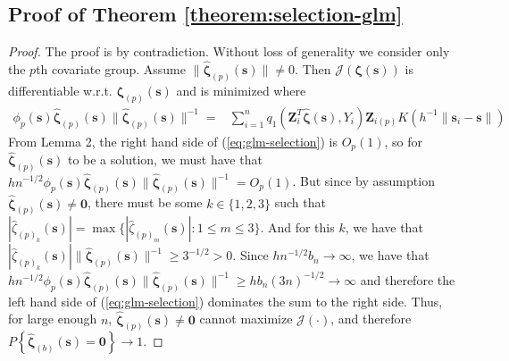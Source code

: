 \documentclass[authoryear,review, 12pt]{elsarticle}
\begin{document}
\subsection*{Proof of Theorem \ref{theorem:selection-glm}}
\begin{proof}
The proof is by contradiction. Without loss of generality we consider
only the $p$th covariate group.
Assume $\|\hat{\bm{\zeta}}_{(p)}(\bm{s})\|\ne0$. Then $\mathcal{J}\left(\bm{\zeta}(\bm{s})\right)$
is differentiable w.r.t. $\bm{\zeta}_{(p)}(\bm{s})$ and is minimized
where 
\begin{align}
\phi_{p}(\bm{s})\hat{\bm{\zeta}}_{(p)}(\bm{s})\|\hat{\bm{\zeta}}_{(p)}(\bm{s})\|^{-1}= & \sum_{i=1}^{n}q_{1}\!\left(\bm{Z}_{i}^{T}\hat{\bm{\zeta}}(\bm{s}),Y_{i}\right)\bm{Z}_{i(p)}K\left(h^{-1}\|\bm{s}_{i}-\bm{s}\|\right)\label{eq:glm-selection}
\end{align}
From Lemma 2, the right hand side of (\ref{eq:glm-selection})
is $O_{p}\left(1\right)$, so for $\hat{\bm{\zeta}}_{(p)}(\bm{s})$
to be a solution, we must have that $hn^{-1/2}\phi_{p}(\bm{s})\hat{\bm{\zeta}}_{(p)}(\bm{s})\|\hat{\bm{\zeta}}_{(p)}(\bm{s})\|^{-1}=O_{p}\left(1\right)$.
But since by assumption $\hat{\bm{\zeta}}_{(p)}(\bm{s})\ne\bm{0}$,
there must be some $k\in\{1,2,3\}$ such that $|\hat{\zeta}_{(p)_{k}}(\bm{s})|=\max\{|\hat{\zeta}_{(p)_{m}}(\bm{s})|:1\le m\le3\}$.
And for this $k$, we have that $|\hat{\zeta}_{(p)_{k}}(\bm{s})|\|\hat{\bm{\zeta}}_{(p)}(\bm{s})\|^{-1}\ge3^{-1/2}>0$.
Since $hn^{-1/2}b_{n}\to\infty$, we have that $hn^{-1/2}\phi_{p}(\bm{s})\hat{\bm{\zeta}}_{(p)}(\bm{s})\|\hat{\bm{\zeta}}_{(p)}(\bm{s})\|^{-1}\ge hb_{n}(3n)^{-1/2}\to\infty$
and therefore the left hand side of (\ref{eq:glm-selection}) dominates
the sum to the right side. Thus, for large enough $n$, $\hat{\bm{\zeta}}_{(p)}(\bm{s})\ne\bm{0}$
cannot maximize $\mathcal{J}\left(\cdot\right)$, and therefore $P\left\{ \hat{\bm{\zeta}}_{(b)}(\bm{s})=\bm{0}\right\} \to1$. 
\end{proof}
\end{document}
